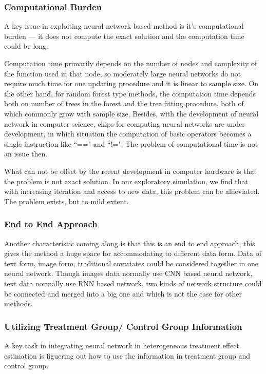 \documentclass[11pt,paper=letter]{scrartcl}
\begin{document}
\subsubsection{Computational Burden}
A key issue in exploiting neural network based method is it's computational burden --- it does not compute the exact solution and the computation time could be long.

Computation time primarily depends on the number of nodes and complexity of the function used in that node, so moderately large neural networks do not require much time for one updating procedure and it is linear to sample size. On the other hand, for random forest type methods, the computation time depends both on number of trees in the forest and the tree fitting procedure, both of which commonly grow with sample size.  Besides, with the development of neural network in computer science, chips for computing neural networks are under development, in which situation the computation of basic operators becomes a single instruction like ``==" and ``!=". The problem of computational time is not an issue then.

What can not be offset by the recent development in computer hardware is that the problem is not exact solution. In our exploratory simulation, we find that with increasing iteration and access to new data, this problem can be allieviated. The problem exists, but to mild extent.

\subsubsection{End to End Approach}
Another characteristic coming along is that this is an end to end approach, this gives the method a huge space for accommodating to different data form. Data of text form, image form, traditional covariates could be considered together in one neural network. Though images data normally use CNN based neural network, text data normally use RNN based network, two kinds of network structure could be connected and merged into a big one and which is not the case for other methods.

\subsubsection{Utilizing Treatment Group/ Control Group Information}
A key task in integrating neural network in heterogeneous treatment effect estimation is figuering out how to use the information in treatment group and control group.
\end{document}
